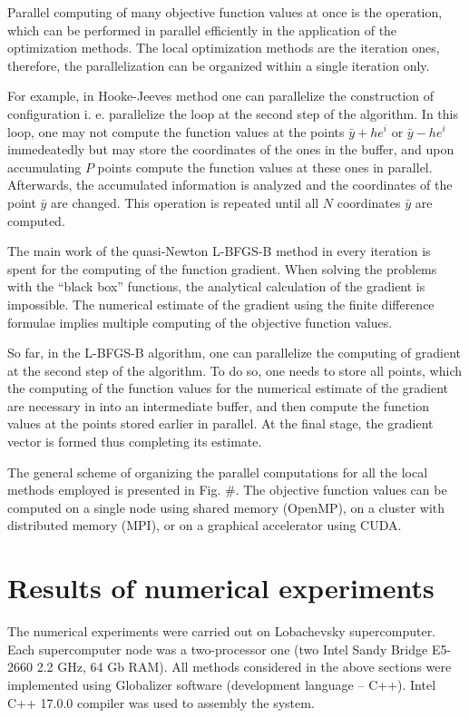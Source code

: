 \documentclass[runningheads]{llncs}
\begin{document}
Parallel computing of many objective function values at once is the operation, which can be performed in parallel efficiently in the application of the optimization methods. The local optimization methods are the iteration ones, therefore, the parallelization can be organized within a single iteration only.

For example, in Hooke-Jeeves method one can parallelize the construction of configuration i. e. parallelize the loop at the second step of the algorithm. In this loop, one may not compute the function values at the points $\bar{y} + he^i$ or $\bar{y} - he^i$ immedeatedly but may store the coordinates of the ones in the buffer, and upon accumulating $P$ points compute the function values at these ones in parallel. Afterwards, the accumulated information is analyzed and the coordinates of the point $\bar{y}$ are changed. This operation is repeated until all $N$ coordinates $\bar{y}$ are computed.

The main work of the quasi-Newton L-BFGS-B method in every iteration is spent for the computing of the function gradient. When solving the problems with the ``black box'' functions, the analytical calculation of the gradient is impossible. The numerical estimate of the gradient using the finite difference formulae implies multiple computing of the objective function values.

So far, in the L-BFGS-B algorithm, one can parallelize the computing of gradient at the second step of the algorithm. To do so, one needs to store all points, which the computing of the function values for the numerical estimate of the gradient are necessary in into an intermediate buffer, and then compute the function values at the points stored earlier in parallel. At the final stage, the gradient vector is formed thus completing its estimate.

The general scheme of organizing the parallel computations for all the local methods employed is presented in Fig. \#. The objective function values can be computed on a single node using shared memory (OpenMP), on a cluster with distributed memory (MPI), or on a graphical accelerator using CUDA.

\section{Results of numerical experiments}
The numerical experiments were carried out on Lobachevsky supercomputer. Each supercomputer node was a two-processor one (two Intel Sandy Bridge E5-2660 2.2 GHz, 64 Gb RAM). All methods considered in the above sections were implemented using Globalizer software \cite{globalizerSystem} (development language – C++). Intel C++ 17.0.0 compiler was used to assembly the system.
\end{document}
